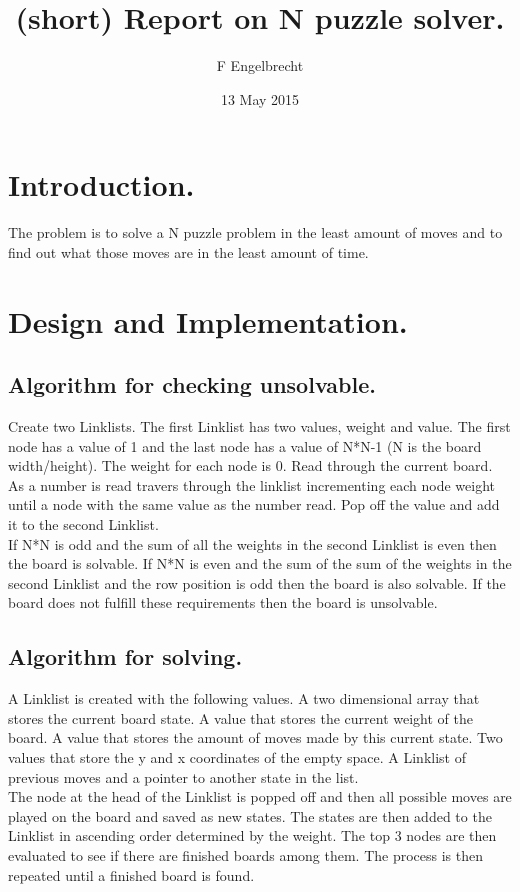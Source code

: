 \documentclass{article}
\title{(short) Report on N puzzle solver.}
\author{F Engelbrecht}
\date{13 May 2015}
\begin{document}
	\maketitle

	\section{Introduction.}

	The problem is to solve a N puzzle problem in the least amount of moves and
	to find out what those moves are in the least amount of time.

	\section{Design and Implementation.}

	\subsection{Algorithm for checking unsolvable.}

	Create two Linklists. The first Linklist has two values, weight and value.
	The first node has a value of 1 and the last node has a value of N*N-1 (N
	is the board width/height). The weight for each node is 0. Read through 
	the current board.  As a number is read travers through the linklist 
	incrementing each node weight until a node with the same value as the 
	number read. Pop off the value and add it to the second Linklist.
	\\
	If N*N is odd and the sum of all the weights in the second Linklist is even
	then the board is solvable. If N*N is even and the sum of the sum of the
	weights in the second Linklist and the row position is odd then the board
	is also solvable. If the board does not fulfill these requirements then the
	board is unsolvable.

	\subsection{Algorithm for solving.}

	A Linklist is created with the following values. A two dimensional array 
	that stores the current board state. A value that stores the current weight
	of the board. A value that stores the amount of moves made by this current
	state. Two values that store the y and x coordinates of the empty space. A
	Linklist of previous moves and a pointer to another state in the list.
	\\
	The node at the head of the Linklist is popped off and then all possible 
	moves are played on the board and saved as new states. The states are then
	added to the Linklist in ascending order determined by the weight. The top 3
	nodes are then evaluated to see if there are finished boards among them. The
	process is then repeated until a finished board is found.

	\subsection{}
\end{document}
